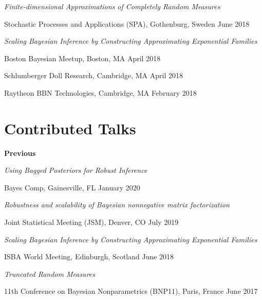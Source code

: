 \documentclass[margin,line]{res}
\newenvironment{talkgroup}{\setlength{\parskip}{3pt}\everypar{\hangafter=1\hangindent=1em\relax}\par}{\par\everypar{\hangafter=0\relax}}
\begin{document}
\begin{resume}
\begin{talkgroup}
\end{talkgroup}

\emph{Finite-dimensional Approximations of Completely Random Measures}

\begin{talkgroup}
Stochastic Processes and Applications (SPA), Gothenburg, Sweden \hfill June 2018

\end{talkgroup}


\emph{Scaling Bayesian Inference by Constructing Approximating Exponential Families}

\begin{talkgroup}
Boston Bayesian Meetup, Boston, MA \hfill April 2018

Schlumberger Doll Research, Cambridge, MA \hfill April 2018

Raytheon BBN Technologies, Cambridge, MA \hfill February 2018

\end{talkgroup}



\section{\sc Contributed Talks}

%
%
%



\textbf{Previous}

\emph{Using Bagged Posteriors for Robust Inference}
\begin{talkgroup}
Bayes Comp, Gainesville, FL \hfill January 2020
\end{talkgroup}

\emph{Robustness and scalability of Bayesian nonnegative matrix factorization}
\begin{talkgroup}
Joint Statistical Meeting (JSM), Denver, CO \hfill July 2019
\end{talkgroup}

\emph{Scaling Bayesian Inference by Constructing Approximating Exponential Families}
\begin{talkgroup}
ISBA World Meeting, Edinburgh, Scotland \hfill June 2018
\end{talkgroup}

\emph{Truncated Random Measures}
\begin{talkgroup}
11th Conference on Bayesian Nonparametrics (BNP11), Paris, France \hfill June 2017
\end{talkgroup}


\end{resume}
\end{document}
